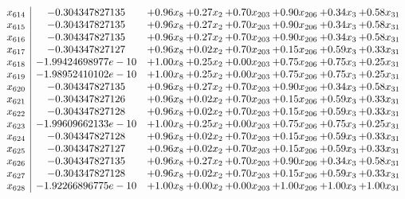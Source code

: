 \documentclass[8pt]{article}
\begin{document}
\[\begin{array}{c| c c@{\hskip 2pt} c@{\hskip 2pt} c@{\hskip 2pt} c@{\hskip 2pt} c@{\hskip 2pt} c@{\hskip 2pt} }
 x_{614}   &  -0.304347827135 & +  0.96 x_{8} & +  0.27 x_{2} & +  0.70 x_{203} & +  0.90 x_{206} & +  0.34 x_{3} & +  0.58 x_{31}\\
 x_{615}   &  -0.304347827135 & +  0.96 x_{8} & +  0.27 x_{2} & +  0.70 x_{203} & +  0.90 x_{206} & +  0.34 x_{3} & +  0.58 x_{31}\\
 x_{616}   &  -0.304347827135 & +  0.96 x_{8} & +  0.27 x_{2} & +  0.70 x_{203} & +  0.90 x_{206} & +  0.34 x_{3} & +  0.58 x_{31}\\
 x_{617}   &  -0.304347827127 & +  0.96 x_{8} & +  0.02 x_{2} & +  0.70 x_{203} & +  0.15 x_{206} & +  0.59 x_{3} & +  0.33 x_{31}\\
 x_{618}   &  -1.99424698977e-10 & +  1.00 x_{8} & +  0.25 x_{2} & +  0.00 x_{203} & +  0.75 x_{206} & +  0.75 x_{3} & +  0.25 x_{31}\\
 x_{619}   &  -1.98952410102e-10 & +  1.00 x_{8} & +  0.25 x_{2} & +  0.00 x_{203} & +  0.75 x_{206} & +  0.75 x_{3} & +  0.25 x_{31}\\
 x_{620}   &  -0.304347827135 & +  0.96 x_{8} & +  0.27 x_{2} & +  0.70 x_{203} & +  0.90 x_{206} & +  0.34 x_{3} & +  0.58 x_{31}\\
 x_{621}   &  -0.304347827126 & +  0.96 x_{8} & +  0.02 x_{2} & +  0.70 x_{203} & +  0.15 x_{206} & +  0.59 x_{3} & +  0.33 x_{31}\\
 x_{622}   &  -0.304347827128 & +  0.96 x_{8} & +  0.02 x_{2} & +  0.70 x_{203} & +  0.15 x_{206} & +  0.59 x_{3} & +  0.33 x_{31}\\
 x_{623}   &  -1.99609662133e-10 & +  1.00 x_{8} & +  0.25 x_{2} & +  0.00 x_{203} & +  0.75 x_{206} & +  0.75 x_{3} & +  0.25 x_{31}\\
 x_{624}   &  -0.304347827128 & +  0.96 x_{8} & +  0.02 x_{2} & +  0.70 x_{203} & +  0.15 x_{206} & +  0.59 x_{3} & +  0.33 x_{31}\\
 x_{625}   &  -0.304347827127 & +  0.96 x_{8} & +  0.02 x_{2} & +  0.70 x_{203} & +  0.15 x_{206} & +  0.59 x_{3} & +  0.33 x_{31}\\
 x_{626}   &  -0.304347827135 & +  0.96 x_{8} & +  0.27 x_{2} & +  0.70 x_{203} & +  0.90 x_{206} & +  0.34 x_{3} & +  0.58 x_{31}\\
 x_{627}   &  -0.304347827128 & +  0.96 x_{8} & +  0.02 x_{2} & +  0.70 x_{203} & +  0.15 x_{206} & +  0.59 x_{3} & +  0.33 x_{31}\\
 x_{628}   &  -1.92266896775e-10 & +  1.00 x_{8} & +  0.00 x_{2} & +  0.00 x_{203} & +  1.00 x_{206} & +  1.00 x_{3} & +  1.00 x_{31}\\

\end{array}\]
\end{document}
